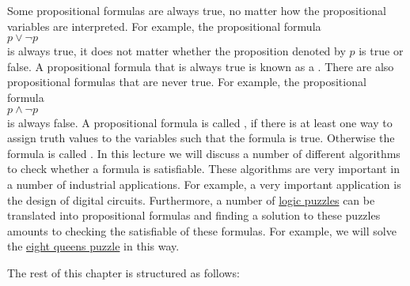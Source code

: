 Some propositional formulas are always true, no matter how the propositional variables are interpreted.
For example, the propositional formula 
\\[0.2cm]
\hspace*{1.3cm}
$p \vee \neg p$
\\[0.2cm]
is always true, it does not matter whether the proposition denoted by $p$ is true or false.  A propositional
formula that is always true is known as a  .  There are also propositional
formulas that are never true.  For example, the propositional formula
\\[0.2cm]
\hspace*{1.3cm}
$p \wedge \neg p$
\\[0.2cm]
is always false.  A propositional formula is called , if there is at least
one way to assign truth values to the variables such that the formula is true.  Otherwise the formula is called
.  In this lecture we will discuss a number of different algorithms to
check whether a formula is satisfiable.  These algorithms are very important in a number of industrial
applications.  For example, a very important application is the design of digital circuits.
Furthermore, a number of \href{https://en.wikipedia.org/wiki/Category:Logic_puzzles}{logic puzzles} can be
translated into propositional formulas and finding a solution to these 
puzzles amounts to checking the satisfiable of these formulas.  For example, we will solve the
\href{https://en.wikipedia.org/wiki/Eight_queens_puzzle}{eight queens puzzle} in this way.

The rest of this chapter is structured as follows:

